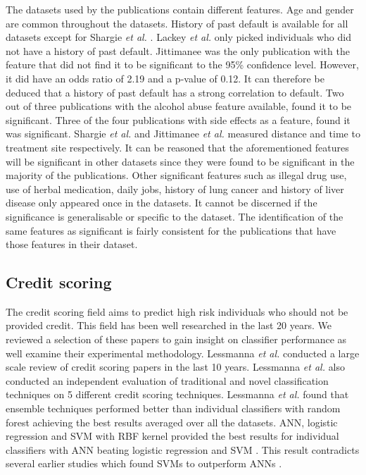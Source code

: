 \documentclass{sig-alternate-05-2015}
\begin{document}
	The datasets used by the publications contain different features. Age and gender are common throughout the datasets. History of past default is available for all datasets except for Shargie \textit{et al.} \cite{Shargie:10.1371/journal.pmed.0040037}. Lackey \textit{et al.} \cite{Lackey:10356751520150601} only picked individuals who did not have a history of past default. Jittimanee \cite{jittimanee:10.1111/j.1440-172X.2007.00650.x} was the only publication with the feature that did not find it to be significant to the 95\% confidence level. However, it did have an odds ratio of 2.19 and a p-value of 0.12. It can therefore be deduced that a history of past default has a strong correlation to default. Two out of three publications with the alcohol abuse feature available, found it to be significant. Three of the four publications with side effects as a feature, found it was significant. Shargie \textit{et al.} \cite{Shargie:10.1371/journal.pmed.0040037} and Jittimanee \textit{et al.} \cite{jittimanee:10.1111/j.1440-172X.2007.00650.x} measured distance and time to treatment site respectively. It can be reasoned that the aforementioned features will be significant in other datasets since they were found to be significant in the majority of the publications. Other significant features such as illegal drug use, use of herbal medication, daily jobs, history of lung cancer and history of liver disease only appeared once in the datasets. It cannot be discerned if the significance is generalisable or specific to the dataset. The identification of the same features as significant is fairly consistent for the publications that have those features in their dataset. 
	
	\subsection{Credit scoring}
	\label{credit-scoring-review}
	The credit scoring field aims to predict high risk individuals who should not be provided credit. This field has been well researched in the last 20 years. We reviewed a selection of these papers to gain insight on classifier performance as well examine their experimental methodology. Lessmanna \textit{et al.} \cite{lessmanna2013benchmarking} conducted a large scale review of credit scoring papers in the last 10 years. Lessmanna \textit{et al.} \cite{lessmanna2013benchmarking} also conducted an independent evaluation of traditional and novel classification techniques on 5 different credit scoring techniques. Lessmanna \textit{et al.} \cite{lessmanna2013benchmarking} found that ensemble techniques performed better than individual classifiers with random forest achieving the best results averaged over all the datasets. ANN, logistic regression and SVM with RBF kernel provided the best results for individual classifiers with ANN beating logistic regression and SVM \cite{lessmanna2013benchmarking}. This result contradicts several earlier studies which found SVMs to outperform ANNs \cite{Danenas20153194, Huang2007847, Huang2004543, Li2006772}. 
	
\end{document}
